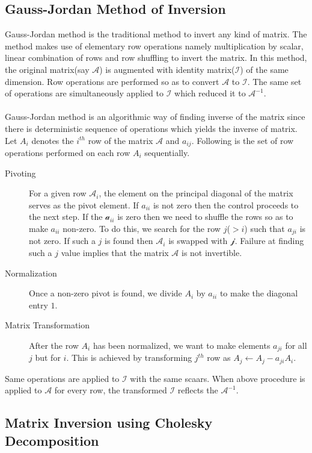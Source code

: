 \documentclass[11pt]{article}
\begin{document}
\subsection{Gauss-Jordan Method of Inversion}
Gauss-Jordan method is the traditional method to invert any kind of matrix. The method makes use of elementary row operations namely multiplication by scalar, linear combination of rows and row shuffling to invert the matrix. In this method, the original matrix(say $\mathcal{A}$) is augmented with identity matrix($\mathcal{I}$) of the same dimension. Row operations are performed so as to convert $\mathcal{A}$ to $\mathcal{I}$. The same set of operations are simultaneously applied to $\mathcal{I}$ which reduced it to $\mathcal{A}^{-1}$. \\\\
Gauss-Jordan method is an algorithmic way of finding inverse of the matrix since there is deterministic sequence of operations which yields the inverse of matrix. Let $A_i$ denotes the $i^{th}$ row of the matrix $\mathcal{A}$ and $a_{ij}$. Following is the set of row operations performed on each row $A_i$ sequentially.
\begin{description}
	\item[Pivoting] For a given row $\mathcal{A}_i$, the element on the principal diagonal of the matrix serves as the pivot element. If $a_{ii}$ is not zero then the control proceeds to the next step. If the $\mathcal{a}_{ii}$ is zero then we need to shuffle the rows so as to make $a_{ii}$ non-zero. To do this, we search for the row $j$($> i$) such that $a_{ji}$ is not zero. If such a $j$ is found then $\mathcal{A}_{i}$ is swapped with $\mathcal{j}$. Failure at finding such a $j$ value implies that the matrix $\mathcal{A}$ is not invertible.
	\item[Normalization] Once a non-zero pivot is found, we divide $A_i$ by $a_{ii}$ to make the diagonal entry $1$.
	\item[Matrix Transformation] After the row $A_i$ has been normalized, we want to make elements $a_{ji}$ for all $j$ but for $i$. This is achieved by transforming $j^{th}$ row as $A_j \leftarrow A_j - a_{ji}A_i$.
\end{description}
Same operations are applied to $\mathcal{I}$ with the same scaars. When above procedure is applied to $\mathcal{A}$ for every row, the transformed $\mathcal{I}$ reflects the $\mathcal{A}^{-1}$.
\subsection{Matrix Inversion using Cholesky Decomposition}
\end{document}
